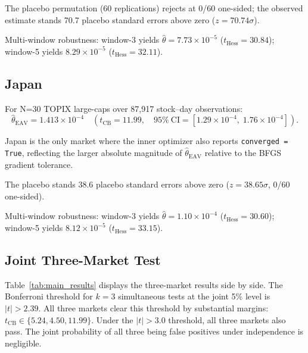 \documentclass[12pt,a4paper]{article}
\begin{document}
The placebo permutation (60 replications) rejects at 0/60 one-sided; the
observed estimate stands 70.7 placebo standard errors above zero
($z = 70.74\sigma$).

Multi-window robustness: window-3 yields $\hat{\theta} = 7.73 \times 10^{-5}$
($t_{\mathrm{Hess}} = 30.84$); window-5 yields $8.29 \times 10^{-5}$
($t_{\mathrm{Hess}} = 32.11$).

\subsection{Japan}

For N=30 TOPIX large-caps over 87,917 stock--day observations:
%
\[
\hat{\theta}_{\mathrm{EAV}} = 1.413 \times 10^{-4}
\quad (t_{\mathrm{CB}} = 11.99,\quad
 95\%\ \mathrm{CI} = [1.29 \times 10^{-4},\; 1.76 \times 10^{-4}]).
\]

Japan is the only market where the inner optimizer also reports
\texttt{converged = True}, reflecting the larger absolute magnitude of
$\hat{\theta}_{\mathrm{EAV}}$ relative to the BFGS gradient tolerance.

The placebo stands 38.6 placebo standard errors above zero
($z = 38.65\sigma$, 0/60 one-sided).

Multi-window robustness: window-3 yields $\hat{\theta} = 1.10 \times 10^{-4}$
($t_{\mathrm{Hess}} = 30.60$); window-5 yields $8.12 \times 10^{-5}$
($t_{\mathrm{Hess}} = 33.15$).

\subsection{Joint Three-Market Test}

Table~\ref{tab:main_results} displays the three-market results side by
side. The Bonferroni threshold for $k = 3$ simultaneous tests at the joint
5\% level is $|t| > 2.39$. All three markets clear this threshold by
substantial margins: $t_{\mathrm{CB}} \in \{5.24, 4.50, 11.99\}$.
Under the \citet{harvey2016} $|t| > 3.0$ threshold, all three markets
also pass. The joint probability of all three being false positives under
independence is negligible.
\end{document}
